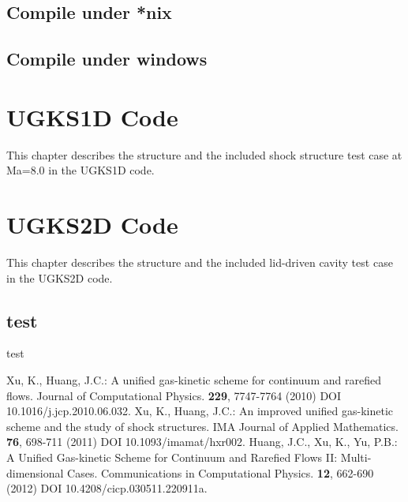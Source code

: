 \documentclass{book}
\begin{document}
\section{Compile under *nix}
\section{Compile under windows}

\chapter{UGKS1D Code}
This chapter describes the structure and the included shock structure test case at Ma=8.0 in the UGKS1D code.

\chapter{UGKS2D Code}
This chapter describes the structure and the included lid-driven cavity test case in the UGKS2D code.
\section{test}
test

\backmatter


\cleardoublepage
{}
{}
\begin{thebibliography}{1}
     Xu, K., Huang, J.C.: A unified gas-kinetic scheme for continuum and rarefied flows. Journal of Computational Physics. {\bf 229}, 7747-7764 (2010) DOI 10.1016/j.jcp.2010.06.032.
     Xu, K., Huang, J.C.: An improved unified gas-kinetic scheme and the study of shock structures. IMA Journal of Applied Mathematics. {\bf 76}, 698-711 (2011) DOI 10.1093/imamat/hxr002.
     Huang, J.C., Xu, K., Yu, P.B.: A Unified Gas-kinetic Scheme for Continuum and Rarefied Flows II: Multi-dimensional Cases. Communications in Computational Physics. {\bf 12}, 662-690 (2012) DOI 10.4208/cicp.030511.220911a.
\end{thebibliography}
\end{document}
